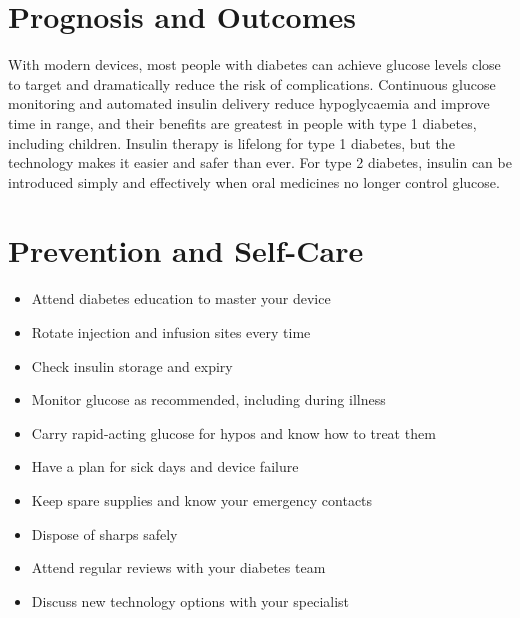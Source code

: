 \section*{Prognosis and Outcomes}
With modern devices, most people with diabetes can achieve glucose levels close to target and dramatically reduce the risk of complications. Continuous glucose monitoring and automated insulin delivery reduce hypoglycaemia and improve time in range, and their benefits are greatest in people with type 1 diabetes, including children. Insulin therapy is lifelong for type 1 diabetes, but the technology makes it easier and safer than ever. For type 2 diabetes, insulin can be introduced simply and effectively when oral medicines no longer control glucose.

\section*{Prevention and Self-Care}
\begin{itemize}
    \item Attend diabetes education to master your device
    \item Rotate injection and infusion sites every time
    \item Check insulin storage and expiry
    \item Monitor glucose as recommended, including during illness
    \item Carry rapid-acting glucose for hypos and know how to treat them
    \item Have a plan for sick days and device failure
    \item Keep spare supplies and know your emergency contacts
    \item Dispose of sharps safely
    \item Attend regular reviews with your diabetes team
    \item Discuss new technology options with your specialist
\end{itemize}

